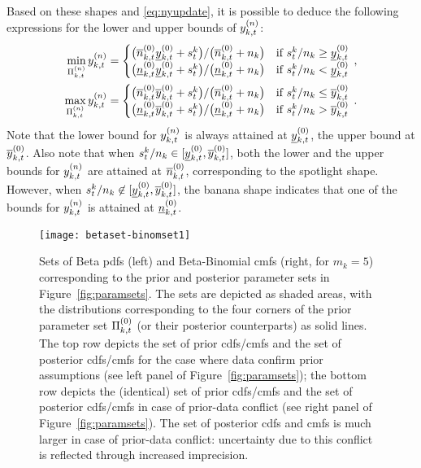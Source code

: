 \documentclass[12pt, a4paper]{elsarticle}
\begin{document}
Based on these shapes and \eqref{eq:nyupdate}, it is possible to deduce the following expressions
for the lower and upper bounds of $y^{(n)}_{k,t}$:
\begin{align}
\begin{aligned}
\min_{\Pi^{(n)}_{k,t}} y^{(n)}_{k,t} &=
 \begin{cases}
 \big(\overline{n}^{(0)}_{k,t} \underline{y}^{(0)}_{k,t} + s^k_t\big) / \big(\overline{n}^{(0)}_{k,t} + n_k\big) & \text{if } s^k_t/n_k \ge \underline{y}^{(0)}_{k,t} \\
 \big(\underline{n}^{(0)}_{k,t} \underline{y}^{(0)}_{k,t} + s^k_t\big) / \big(\underline{n}^{(0)}_{k,t} + n_k\big) & \text{if } s^k_t/n_k <   \underline{y}^{(0)}_{k,t}
 \end{cases}\,,\\
\max_{\Pi^{(n)}_{k,t}} y^{(n)}_{k,t} &=
 \begin{cases}
 \big(\overline{n}^{(0)}_{k,t} \overline{y}^{(0)}_{k,t} + s^k_t\big) / \big(\overline{n}^{(0)}_{k,t} + n_k\big) & \text{if } s^k_t/n_k \le \overline{y}^{(0)}_{k,t} \\
 \big(\underline{n}^{(0)}_{k,t} \overline{y}^{(0)}_{k,t} + s^k_t\big) / \big(\underline{n}^{(0)}_{k,t} + n_k\big) & \text{if } s^k_t/n_k >   \overline{y}^{(0)}_{k,t}
 \end{cases}\,.
\end{aligned}
\label{eq:ysetupdate}
\end{align}
Note that the lower bound for $y^{(n)}_{k,t}$ is always attained at $\underline{y}^{(0)}_{k,t}$, the upper bound at $\overline{y}^{(0)}_{k,t}$.
Also note that when $s^k_t/n_k \in [\underline{y}^{(0)}_{k,t}, \overline{y}^{(0)}_{k,t}]$,
both the lower and the upper bounds for $y^{(n)}_{k,t}$ are attained at $\overline{n}^{(0)}_{k,t}$,
corresponding to the spotlight shape.
However, when $s^k_t/n_k \not\in [\underline{y}^{(0)}_{k,t}, \overline{y}^{(0)}_{k,t}]$,
the banana shape indicates that
one of the bounds for $y^{(n)}_{k,t}$ is attained at $\underline{n}^{(0)}_{k,t}$.

\begin{figure}
\texttt{[image: betaset-binomset1]}
\caption{Sets of Beta pdfs (left) and Beta-Binomial cmfs (right, for $m_k=5$)
corresponding to the prior and posterior parameter sets in Figure~\ref{fig:paramsets}.
The sets are depicted as shaded areas,
with the distributions corresponding to the four corners
of the prior parameter set $\Pi^{(0)}_{k,t}$ (or their posterior counterparts) as solid lines.
The top row depicts the set of prior cdfs/cmfs and the set of posterior cdfs/cmfs for the case where data confirm prior assumptions
(see left panel of Figure~\ref{fig:paramsets});
the bottom row depicts the (identical) set of prior cdfs/cmfs and the set of posterior cdfs/cmfs in case of prior-data conflict
(see right panel of Figure~\ref{fig:paramsets}).
The set of posterior cdfs and cmfs
is much larger in case of prior-data conflict:
uncertainty due to this conflict is reflected through increased imprecision.}
\label{fig:betaset-binomset}
\end{figure}
\end{document}
